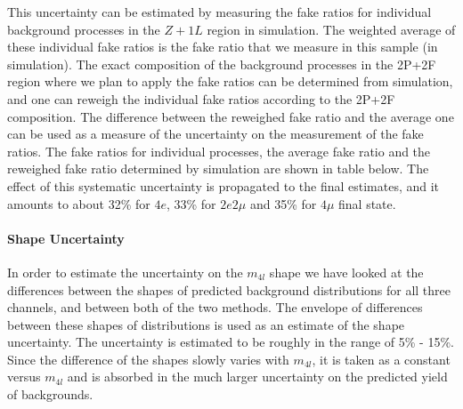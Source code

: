 This uncertainty can be estimated by measuring the fake ratios for individual background processes in the $Z+1L$ region in simulation. The weighted average of these individual fake ratios is the fake ratio that we measure in this sample (in simulation). The exact composition of the background processes in the 2P+2F region where we plan to apply the fake ratios can be determined from simulation, and one can reweigh the individual fake ratios according to the 2P+2F composition. The difference between the reweighed fake ratio and the average one can be used as a measure of the uncertainty on the measurement of the fake ratios. The fake ratios for individual processes, the average fake ratio and the reweighed fake ratio determined by simulation are shown in table below. The effect of this systematic uncertainty is propagated to the final estimates, and it amounts to about 32\% for $4e$, 33\% for $2e2\mu$ and 35\% for $4\mu$ final state. 

    

\paragraph{Shape Uncertainty}
In order to estimate the uncertainty on the $m_{4l}$ shape we have looked at the differences between the shapes of predicted background distributions for all three channels, and between both of the two methods. The envelope of differences between these shapes of distributions is used as an estimate of the shape uncertainty. The uncertainty is estimated to be roughly in the range of 5\% - 15\%. Since the difference of the shapes slowly varies with $m_{4l}$, it is taken as a constant versus $m_{4l}$  and is absorbed in the much larger uncertainty on the predicted yield of backgrounds. 


